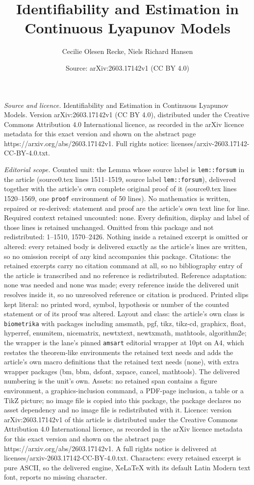 \documentclass[10pt,a4paper]{amsart}
\title[Identifiability and Estimation in Continuous Lyapunov Models]{Identifiability and Estimation in Continuous Lyapunov Models}
\author{Cecilie Olesen Recke, Niels Richard Hansen}
\date{Source: arXiv:2603.17142v1 (CC BY 4.0)}
\begin{document}
\maketitle

\noindent\emph{Source and licence.} Identifiability and Estimation in Continuous Lyapunov Models. Version arXiv:2603.17142v1 (CC BY 4.0), distributed under the Creative Commons Attribution 4.0 International licence, as recorded in the arXiv licence metadata for this exact version and shown on the abstract page https://arxiv.org/abs/2603.17142v1. Full rights notice: licenses/arxiv-2603.17142-CC-BY-4.0.txt.\par\smallskip

\noindent\textit{Editorial scope.} Counted unit: the Lemma whose source label is \texttt{lem::forsum} in the article (source0.tex lines 1511--1519, source label \texttt{lem::forsum}), delivered together with the article's own complete original proof of it (source0.tex lines 1520--1569, one \texttt{proof} environment of 50 lines). No mathematics is written, repaired or re-derived: statement and proof are the article's own text line for line. Required context retained uncounted: none. Every definition, display and label of those lines is retained unchanged. Omitted from this package and not redistributed: 1--1510, 1570--2426. Nothing inside a retained excerpt is omitted or altered: every retained body is delivered exactly as the article's lines are written, so no omission receipt of any kind accompanies this package. Citations: the retained excerpts carry no citation command at all, so no bibliography entry of the article is transcribed and no reference is redistributed. Reference adaptation: none was needed and none was made; every reference inside the delivered unit resolves inside it, so no unresolved reference or citation is produced. Printed slips kept literal: no printed word, symbol, hypothesis or number of the counted statement or of its proof was altered. Layout and class: the article's own class is \texttt{biometrika} with packages including amsmath, pgf, tikz, tikz-cd, graphicx, float, hyperref, enumitem, nicematrix, newtxtext, newtxmath, mathtools, algorithm2e; the wrapper is the lane's pinned \texttt{amsart} editorial wrapper at 10pt on A4, which restates the theorem-like environments the retained text needs and adds the article's own macro definitions that the retained text needs (none), with extra wrapper packages (bm, bbm, dsfont, xspace, cancel, mathtools). The delivered numbering is the unit's own. Assets: no retained span contains a figure environment, a graphics-inclusion command, a PDF-page inclusion, a table or a TikZ picture; no image file is copied into this package, the package declares no asset dependency and no image file is redistributed with it. Licence: version arXiv:2603.17142v1 of this article is distributed under the Creative Commons Attribution 4.0 International licence, as recorded in the arXiv licence metadata for this exact version and shown on the abstract page https://arxiv.org/abs/2603.17142v1. A full rights notice is delivered at licenses/arxiv-2603.17142-CC-BY-4.0.txt. Characters: every retained excerpt is pure ASCII, so the delivered engine, XeLaTeX with its default Latin Modern text font, reports no missing character.
\end{document}
